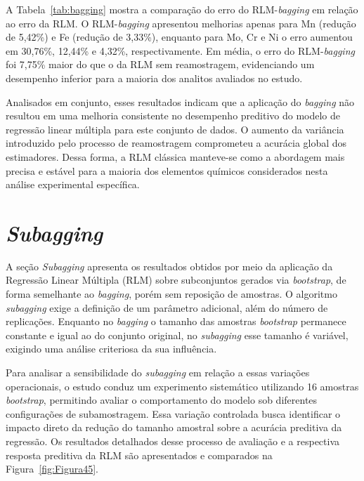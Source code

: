 A Tabela~\ref{tab:bagging} mostra a comparação do erro do RLM-\textit{bagging} em relação ao erro da RLM. O RLM-\textit{bagging} apresentou melhorias apenas para Mn (redução de 5,42\%) e Fe (redução de 3,33\%), enquanto para Mo, Cr e Ni o erro aumentou em 30,76\%, 12,44\% e 4,32\%, respectivamente. Em média, o erro do RLM-\textit{bagging} foi 7,75\% maior do que o da RLM sem reamostragem, evidenciando um desempenho inferior para a maioria dos analitos avaliados no estudo.

Analisados em conjunto, esses resultados indicam que a aplicação do \textit{bagging} não resultou em uma melhoria consistente no desempenho preditivo do modelo de regressão linear múltipla para este conjunto de dados. O aumento da variância introduzido pelo processo de reamostragem comprometeu a acurácia global dos estimadores. Dessa forma, a RLM clássica manteve-se como a abordagem mais precisa e estável para a maioria dos elementos químicos considerados nesta análise experimental específica.

\section{\textit{Subagging}}
\label{sec:subagging2}

A seção \textit{Subagging} apresenta os resultados obtidos por meio da aplicação da Regressão Linear Múltipla (RLM) sobre subconjuntos gerados via \textit{bootstrap}, de forma semelhante ao \textit{bagging}, porém sem reposição de amostras. O algoritmo \textit{subagging} exige a definição de um parâmetro adicional, além do número de replicações. Enquanto no \textit{bagging} o tamanho das amostras \textit{bootstrap} permanece constante e igual ao do conjunto original, no \textit{subagging} esse tamanho é variável, exigindo uma análise criteriosa da sua influência.

Para analisar a sensibilidade do \textit{subagging} em relação a essas variações operacionais, o estudo conduz um experimento sistemático utilizando 16 amostras \textit{bootstrap}, permitindo avaliar o comportamento do modelo sob diferentes configurações de subamostragem. Essa variação controlada busca identificar o impacto direto da redução do tamanho amostral sobre a acurácia preditiva da regressão. Os resultados detalhados desse processo de avaliação e a respectiva resposta preditiva da RLM são apresentados e comparados na Figura~\ref{fig:Figura45}.

